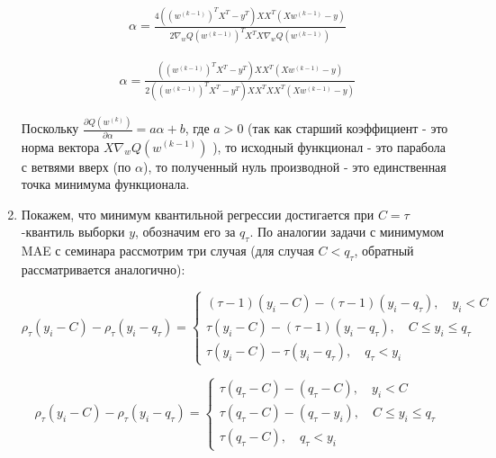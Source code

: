\documentclass{article}
\begin{document}
\begin{enumerate}
    \begin{gather*}
        \alpha = \frac{4 ({(w^{(k - 1)})}^T X^T - y^T) X X^T (X w^{(k - 1)} - y)}{2 {\nabla_w Q(w^{(k - 1)})}^T X^T X \nabla_w Q(w^{(k - 1)})}
    \end{gather*}

    \begin{gather*}
        \alpha = \frac{({(w^{(k - 1)})}^T X^T - y^T) X X^T (X w^{(k - 1)} - y)}
        {2 ({(w^{(k - 1)})}^T X^T - y^T) X X^T X X^T (X w^{(k - 1)} - y)}
    \end{gather*}
    \normalsize

    Поскольку \( \frac{\partial Q(w^{(k)})}{\partial \alpha} = a\alpha + b \), где \( a > 0 \) (так как старший коэффициент - это норма вектора
    \( X \nabla_w Q(w^{(k - 1)}) \) ), то исходный функционал - это парабола с ветвями вверх (по \( \alpha \)), то полученный нуль производной -
    это единственная точка минимума функционала.

    \item Покажем, что минимум квантильной регрессии достигается при $ C = \tau $-квантиль выборки $ y $, обозначим его за $ q_{\tau} $.
    По аналогии задачи с минимумом MAE с семинара рассмотрим три случая (для случая $ C < q_{\tau} $, обратный рассматривается аналогично):

    \small
    \begin{equation*}
        {\rho}_{\tau}(y_i - C) - {\rho}_{\tau}(y_i - q_{\tau}) = 
        \begin{cases}
            (\tau - 1)(y_i - C) - (\tau - 1)(y_i - q_{\tau}), \quad y_i < C \\
            \tau(y_i - C) - (\tau - 1)(y_i - q_{\tau}), \quad C \le y_i \le q_{\tau} \\
            \tau(y_i - C) - \tau(y_i - q_{\tau}), \quad q_{\tau} < y_i
        \end{cases}
    \end{equation*}

    \begin{equation*}
        {\rho}_{\tau}(y_i - C) - {\rho}_{\tau}(y_i - q_{\tau}) = 
        \begin{cases}
            \tau(q_{\tau} - C) - (q_{\tau} - C), \quad y_i < C \\
            \tau(q_{\tau} - C) - (q_{\tau} - y_i), \quad C \le y_i \le q_{\tau} \\
            \tau(q_{\tau} - C), \quad q_{\tau} < y_i
        \end{cases}
    \end{equation*}
        

\end{enumerate}
\end{document}
